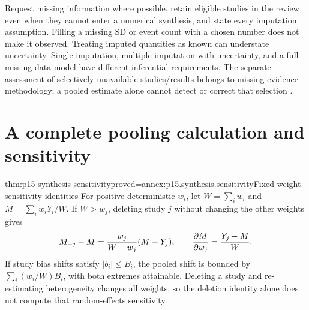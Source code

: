 Request missing information where possible, retain eligible studies in the
review even when they cannot enter a numerical synthesis, and state every
imputation assumption. Filling a missing SD or event count with a chosen
number does not make it observed. Treating imputed quantities as known can
understate uncertainty. Single imputation, multiple imputation with uncertainty,
and a full missing-data model have different inferential requirements.
The separate assessment of selectively unavailable studies/results belongs
to missing-evidence methodology; a pooled estimate alone cannot detect or
correct that selection \cite[sec.~10.12]{DeeksEtAl2024Cochrane10}.

\section{A complete pooling calculation and sensitivity}
\label{sec:p15-synthesis-example}

\begin{hbtheorem}{thm:p15-synthesis-sensitivity}{proved=annex:p15.synthesis.sensitivity}{Fixed-weight sensitivity identities}
For positive deterministic \(w_i\), let \(W=\sum_iw_i\) and
\(M=\sum_iw_iY_i/W\). If \(W>w_j\), deleting study \(j\)
without changing the other weights gives
\[
 M_{-j}-M={w_j\over W-w_j}(M-Y_j),\qquad
 {\partial M\over\partial w_j}={Y_j-M\over W}.
\]
If study bias shifts satisfy \(|b_i|\leq B_i\), the pooled shift
is bounded by \(\sum_i(w_i/W)B_i\), with both extremes attainable.
Deleting a study and re-estimating heterogeneity changes all weights, so the
deletion identity alone does not compute that random-effects sensitivity.
\end{hbtheorem}

